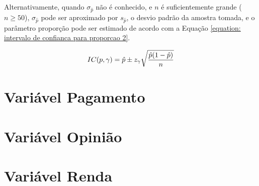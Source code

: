 \documentclass[10pt,a4paper,oneside]{article}
\begin{document}
	Alternativamente, quando $\sigma_{\hat{p}}$ não é conhecido, e $n$ é
	suficientemente grande ($n \geq 50$), $\sigma_{\hat{p}}$ pode
	ser aproximado por $s_{\hat{p}}$, o desvio padrão da amostra tomada, e o
	parâmetro proporção pode ser estimado de acordo com a Equação
	\ref{equation: intervalo de confianca para proporcao 2}.

		\begin{equation}
			IC(p, \gamma) = \hat{p} \pm z_\gamma \sqrt{\frac{\hat{p}(1-\hat{p})}{n}} \\
			\label{equation: intervalo de confianca para proporcao 2}
		\end{equation}

\section{Variável Pagamento}
\label{questao:4}


\section{Variável Opinião}
\label{questao:5}


\section{Variável Renda}
\label{questao:6}

\end{document}
